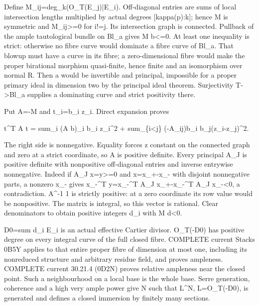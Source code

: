 \documentclass[11pt]{article}
\begin{document}
Define M\_ij=deg\_k(O\_T(E\_j)|E\_i). Off-diagonal entries are sums of local intersection lengths multiplied by actual degrees [kappa(p):k]; hence M is symmetric and M\_ij>=0 for i!=j. Its intersection graph is connected. Pullback of the ample tautological bundle on Bl\_a gives M b<=0. At least one inequality is strict: otherwise no fibre curve would dominate a fibre curve of Bl\_a. That blowup must have a curve in its fibre; a zero-dimensional fibre would make the proper birational morphism quasi-finite, hence finite and an isomorphism over normal R. Then a would be invertible and principal, impossible for a proper primary ideal in dimension two by the principal ideal theorem. Surjectivity T->Bl\_a supplies a dominating curve and strict positivity there.

Put A=-M and t\_i=b\_i z\_i. Direct expansion proves

    t\textasciicircum{}T A t = sum\_i (A b)\_i b\_i z\_i\textasciicircum{}2
              + sum\_\{i<j\} (-A\_ij)b\_i b\_j(z\_i-z\_j)\textasciicircum{}2.

The right side is nonnegative. Equality forces z constant on the connected graph and zero at a strict coordinate, so A is positive definite. Every principal A\_J is positive definite with nonpositive off-diagonal entries and inverse entrywise nonnegative. Indeed if A\_J x=y>=0 and x=x\_+-x\_- with disjoint nonnegative parts, a nonzero x\_- gives x\_-\textasciicircum{}T y=x\_-\textasciicircum{}T A\_J x\_+-x\_-\textasciicircum{}T A\_J x\_-<0, a contradiction. A\textasciicircum{}-1 1 is strictly positive: at a zero coordinate its row value would be nonpositive. The matrix is integral, so this vector is rational. Clear denominators to obtain positive integers d\_i with M d<0.

D0=sum d\_i E\_i is an actual effective Cartier divisor. O\_T(-D0) has positive degree on every integral curve of the full closed fibre. COMPLETE current Stacks 0B5Y applies to that entire proper fibre of dimension at most one, including its nonreduced structure and arbitrary residue field, and proves ampleness. COMPLETE current 30.21.4 (0D2N) proves relative ampleness near the closed point. Such a neighbourhood on a local base is the whole base. Serre generation, coherence and a high very ample power give N such that L\textasciicircum{}N, L=O\_T(-D0), is generated and defines a closed immersion by finitely many sections.
\end{document}
